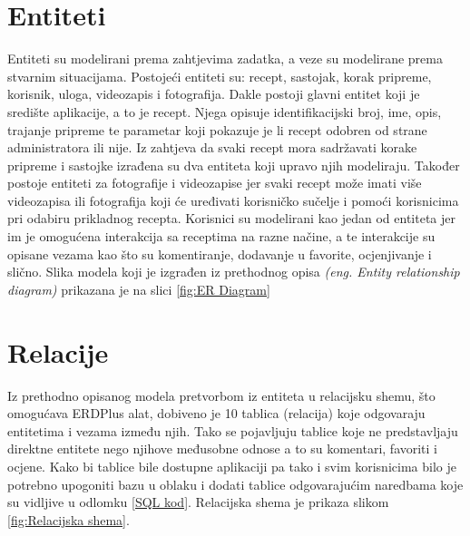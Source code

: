 \documentclass[times, utf8, zavrsni]{fer}
\begin{document}
\section{Entiteti}
Entiteti su modelirani prema zahtjevima zadatka, a veze su modelirane prema stvarnim situacijama.
Postojeći entiteti su: recept, sastojak, korak pripreme, korisnik, uloga, videozapis i
fotografija. Dakle postoji glavni entitet koji je središte aplikacije, a to je recept.
Njega opisuje identifikacijski broj, ime, opis, trajanje pripreme
te parametar koji pokazuje je li recept odobren od strane administratora ili nije.
Iz zahtjeva da svaki recept mora sadržavati korake pripreme i sastojke izrađena su dva entiteta
koji upravo njih modeliraju.
Također postoje entiteti za fotografije i videozapise jer svaki recept može imati
više videozapisa ili fotografija koji će uređivati korisničko sučelje
i pomoći korisnicima pri odabiru prikladnog recepta.
Korisnici su modelirani kao jedan od entiteta jer im je omogućena interakcija sa receptima
na razne načine, a te interakcije su opisane vezama kao što su komentiranje,
dodavanje u favorite, ocjenjivanje i slično. Slika modela koji je izgrađen iz prethodnog opisa
\textit{(eng. Entity relationship diagram)} prikazana je na slici \ref{fig:ER Diagram}

\section{Relacije}
Iz prethodno opisanog modela pretvorbom iz entiteta u relacijsku shemu, što omogućava
ERDPlus alat, dobiveno je 10 tablica (relacija) koje odgovaraju
entitetima i vezama između njih. Tako se pojavljuju tablice koje ne predstavljaju direktne entitete
nego njihove međusobne odnose a to su komentari, favoriti i ocjene. Kako bi tablice bile dostupne aplikaciji pa tako i svim
korisnicima bilo je potrebno upogoniti bazu u oblaku i dodati tablice odgovarajućim naredbama
koje su vidljive u odlomku \ref{SQL kod}.
Relacijska shema je prikaza slikom \ref{fig:Relacijska shema}.
\end{document}
